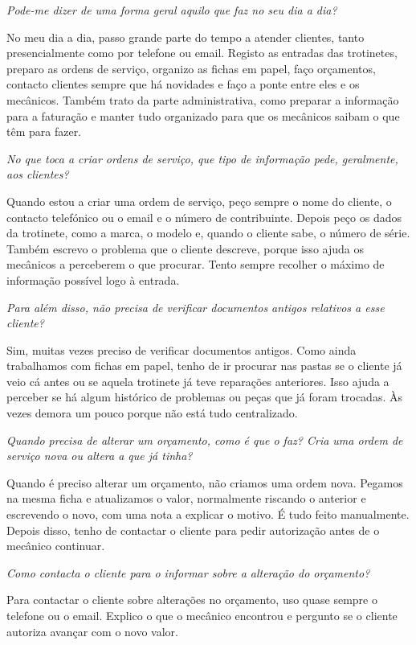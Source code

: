 \documentclass[11pt,a4paper]{article}
\newcommand{\pergunta}[1]{\item[P:] \textit{#1}}
\newcommand{\resposta}[1]{\item[R:] #1}
\begin{document}
	\begin{transcription}
		
		\pergunta{Pode-me dizer de uma forma geral aquilo que faz no seu dia a dia?}
		\resposta{No meu dia a dia, passo grande parte do tempo a atender clientes, tanto presencialmente como por telefone ou email. Registo as entradas das trotinetes, preparo as ordens de serviço, organizo as fichas em papel, faço orçamentos, contacto clientes sempre que há novidades e faço a ponte entre eles e os mecânicos. Também trato da parte administrativa, como preparar a informação para a faturação e manter tudo organizado para que os mecânicos saibam o que têm para fazer.}

		\pergunta{No que toca a criar ordens de serviço, que tipo de informação pede, geralmente, aos clientes?}
		\resposta{Quando estou a criar uma ordem de serviço, peço sempre o nome do cliente, o contacto telefónico ou o email e o número de contribuinte. Depois peço os dados da trotinete, como a marca, o modelo e, quando o cliente sabe, o número de série. Também escrevo o problema que o cliente descreve, porque isso ajuda os mecânicos a perceberem o que procurar. Tento sempre recolher o máximo de informação possível logo à entrada.}

		\pergunta{Para além disso, não precisa de verificar documentos antigos relativos a esse cliente?}
		\resposta{Sim, muitas vezes preciso de verificar documentos antigos. Como ainda trabalhamos com fichas em papel, tenho de ir procurar nas pastas se o cliente já veio cá antes ou se aquela trotinete já teve reparações anteriores. Isso ajuda a perceber se há algum histórico de problemas ou peças que já foram trocadas. Às vezes demora um pouco porque não está tudo centralizado.}

		\pergunta{Quando precisa de alterar um orçamento, como é que o faz? Cria uma ordem de serviço nova ou altera a que já tinha?}
		\resposta{Quando é preciso alterar um orçamento, não criamos uma ordem nova. Pegamos na mesma ficha e atualizamos o valor, normalmente riscando o anterior e escrevendo o novo, com uma nota a explicar o motivo. É tudo feito manualmente. Depois disso, tenho de contactar o cliente para pedir autorização antes de o mecânico continuar.}

		\pergunta{Como contacta o cliente para o informar sobre a alteração do orçamento?}
		\resposta{Para contactar o cliente sobre alterações no orçamento, uso quase sempre o telefone ou o email. Explico o que o mecânico encontrou e pergunto se o cliente autoriza avançar com o novo valor.}
		

\end{transcription}
\end{document}
